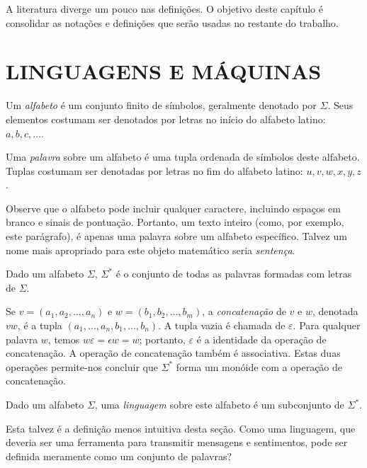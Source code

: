 A literatura diverge um pouco nas definições.
O objetivo deste capítulo é consolidar
as notações e definições
que serão usadas no restante do trabalho.


\section{LINGUAGENS E MÁQUINAS}

\begin{definition}
    Um \emph{alfabeto}
    é um conjunto finito de símbolos,
    geralmente denotado por $\Sigma$.
    Seus elementos costumam ser denotados
    por letras no início do alfabeto latino:
    $a, b, c, \dots$.
\end{definition}
\begin{definition}
    Uma \emph{palavra} sobre um alfabeto
    é uma tupla ordenada de símbolos deste alfabeto.
    Tuplas costumam ser denotadas
    por letras no fim do alfabeto latino:
    $u, v, w, x, y, z$.
\end{definition}

Observe que o alfabeto
pode incluir qualquer caractere,
incluindo espaços em branco
e sinais de pontuação.
Portanto,
um texto inteiro
(como, por exemplo, este parágrafo),
é apenas uma palavra sobre um alfabeto específico.
Talvez um nome mais apropriado para este objeto matemático
seria \emph{sentença}.

\begin{definition}
    Dado um alfabeto $\Sigma$,
    $\Sigma^*$ é o conjunto de todas as palavras
    formadas com letras de $\Sigma$.
\end{definition}
Se $v = (a_1, a_2, \dots, a_n)$
e $w = (b_1, b_2, \dots, b_m)$,
a \emph{concatenação} de $v$ e $w$,
denotada $vw$,
é a tupla $(a_1, \dots, a_n, b_1, \dots, b_n)$.
A tupla vazia é chamada de $\varepsilon$.
Para qualquer palavra $w$,
temos $w\varepsilon = \epsilon w = w$;
portanto,
$\varepsilon$ é a identidade da operação de concatenação.
A operação de concatenação também é associativa.
Estas duas operações permite-nos concluir
que $\Sigma^*$ forma um monóide
com a operação de concatenação.

\begin{definition}
    Dado um alfabeto $\Sigma$,
    uma \emph{linguagem} sobre este alfabeto
    é um subconjunto de $\Sigma^*$.
\end{definition}
Esta talvez é a definição menos intuitiva desta seção.
Como uma linguagem,
que deveria ser uma ferramenta para transmitir mensagens
e sentimentos,
pode ser definida
meramente como um conjunto de palavras?

